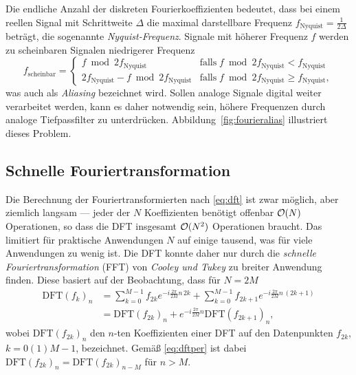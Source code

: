 \enlargethispage{\baselineskip}

Die endliche Anzahl der diskreten Fourierkoeffizienten bedeutet, dass
bei einem reellen Signal mit Schrittweite $\Delta$ die maximal
darstellbare Frequenz $f_\text{Nyquist}=\frac{1}{2\Delta}$ beträgt,
die sogenannte
\emph{Nyquist-Frequenz}. Signale mit höherer
Frequenz $f$ werden zu scheinbaren Signalen niedrigerer Frequenz
\begin{equation}
  f_\text{scheinbar} = \begin{cases}
    f \bmod 2 f_\text{Nyquist} & \text{falls}\; f \bmod 2 f_\text{Nyquist}
    < f_\text{Nyquist} \\
    2f_\text{Nyquist} - f \bmod 2 f_\text{Nyquist} & \text{falls}\; f \bmod 2 f_\text{Nyquist}
    \ge f_\text{Nyquist},
  \end{cases}
\end{equation}
was auch als \emph{Aliasing} bezeichnet
wird. Sollen analoge Signale digital weiter verarbeitet werden, kann
es daher notwendig sein, höhere Frequenzen durch analoge
Tiefpassfilter zu unterdrücken. Abbildung~\ref{fig:fourieralias}
illustriert dieses Problem.

\subsection{Schnelle Fouriertransformation}

Die Berechnung der Fouriertransformierten nach \eqref{eq:dft} ist zwar
möglich, aber ziemlich langsam --- jeder der $N$ Koeffizienten
benötigt offenbar $\mathcal O(N)$ Operationen, so dass die DFT insgesamt
$\mathcal O(N^2)$ Operationen braucht. Das limitiert für praktische
Anwendungen $N$ auf einige tausend, was für viele Anwendungen zu wenig
ist. Die DFT konnte daher nur durch die \emph{schnelle
  Fouriertransformation} (FFT) von \emph{Cooley und Tukey} zu breiter
Anwendung finden. Diese basiert auf der Beobachtung, dass für $N=2M$
\begin{align}
  \text{DFT}(f_k)_n &= \sum_{k=0}^{M-1} f_{2k} e^{-i\frac{2\pi}{2M} n\, 2k} +
  \sum_{k=0}^{M-1} f_{2k+1} e^{-i\frac{2\pi}{2M} n\, (2k + 1)}\\
  &= \text{DFT}(f_{2k})_n + e^{-i\frac{2\pi}{2M} n}
  \text{DFT}(f_{2k+1})_n,
\end{align}
wobei $\text{DFT}(f_{2k})_n$ den $n$-ten Koeffizienten einer DFT auf
den Datenpunkten $f_{2k}$, $k=0(1)M-1$, bezeichnet. Gemäß
\eqref{eq:dftper} ist dabei $\text{DFT}(f_{2k})_n =
\text{DFT}(f_{2k})_{n-M}$ für $n>M$.

